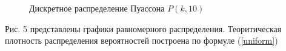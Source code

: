 \documentclass[12pt]{article}
\newcommand{\lskip}{\hfill\break}
\begin{document}
\begin{flushleft}
\begin{figure}[h!]
        \begin{minipage}[h]{0.325\linewidth}
        \end{minipage}
        \caption{Дискретное распределение Пуассона $P(k, 10)$}
    \end{figure}
    \lskip

     Рис. 5 представлены графики равномерного распределения. Теоритическая плотность распределения вероятностей построена по формуле (\ref{uniform})


\end{flushleft}
\end{document}
